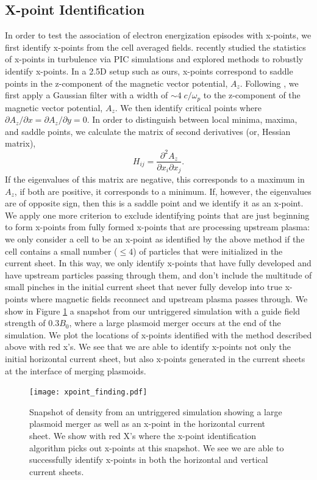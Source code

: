 \documentclass[iop,twocolappendix]{emulateapj}
\begin{document}
\subsection{X-point Identification} \label{xpoint_id}
In order to test the association of electron energization episodes with x-points, we first identify x-points from the cell averaged fields.  \citet{haggerty2017} recently studied the statistics of x-points in turbulence via PIC simulations and explored methods to robustly identify x-points.  In a 2.5D setup such as ours, x-points correspond to saddle points in the z-component of the magnetic vector potential, $A_{z}$.  Following \citet{haggerty2017}, we first apply a Gaussian filter with a width of $\sim 4 \; c/\omega_{p}$ to the z-component of the magnetic vector potential, $A_{z}$.  We then identify critical points where $\partial A_{z}/\partial x=\partial A_{z}/\partial y=0$.  In order to distinguish between local minima, maxima, and saddle points, we calculate the matrix of second derivatives (or, Hessian matrix), 
$$H_{ij}=\frac{\partial^{2} A_{z}}{\partial x_{i} \partial x_{j}}.$$  If the eigenvalues of this matrix are negative, this corresponds to a maximum in $A_{z}$, if both are positive, it corresponds to a minimum.  If, however, the eigenvalues are of opposite sign, then this is a saddle point and we identify it as an x-point.  We apply one more criterion to exclude identifying points that are just beginning to form x-points from fully formed x-points that are processing upstream plasma: we only consider a cell to be an x-point as identified by the above method if the cell contains a small number ($\leq 4$) of particles that were initialized in the current sheet.  In this way, we only identify x-points that have fully developed and have upstream particles passing through them, and don't include the multitude of small pinches in the initial current sheet that never fully develop into true x-points where magnetic fields reconnect and upstream plasma passes through.   We show in Figure \ref{xpoint_finding} a snapshot from our untriggered simulation with a guide field strength of $0.3 B_{0}$, where a large plasmoid merger occurs at the end of the simulation.  We plot the locations of x-points identified with the method described above with red x's.  We see that we are able to identify x-points not only the initial horizontal current sheet, but also x-points generated in the current sheets at the interface of merging plasmoids.


 \begin{figure}[htp]
 	
 	\texttt{[image: xpoint\_finding.pdf]}
 	\caption{Snapshot of density from an untriggered simulation showing a large plasmoid merger as well as an x-point in the horizontal current sheet.  We show with red X's where the x-point identification algorithm picks out x-points at this snapshot.  We see we are able to successfully identify x-points in both the horizontal and vertical current sheets.}
 	\label{xpoint_finding}
 \end{figure}
\end{document}
